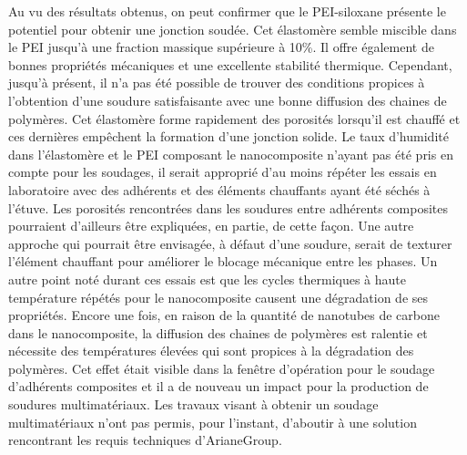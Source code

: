 Au vu des résultats obtenus, on peut confirmer que le PEI-siloxane présente le potentiel pour obtenir une jonction soudée. 
Cet élastomère semble miscible dans le PEI jusqu'à une fraction massique supérieure à 10\%. 
Il offre également de bonnes propriétés mécaniques et une excellente stabilité thermique. 
Cependant, jusqu'à présent, il n'a pas été possible de trouver des conditions propices à l'obtention d'une soudure satisfaisante avec une bonne diffusion des chaines de polymères. 
Cet élastomère forme rapidement des porosités lorsqu'il est chauffé et ces dernières empêchent la formation d'une jonction solide. 
Le taux d'humidité dans l'élastomère et le PEI composant le nanocomposite n'ayant pas été pris en compte pour les soudages, il serait approprié d'au moins répéter les essais en laboratoire avec des adhérents et des éléments chauffants ayant été séchés à l'étuve. 
Les porosités rencontrées dans les soudures entre adhérents composites pourraient d'ailleurs être expliquées, en partie, de cette façon. 
Une autre approche qui pourrait être envisagée, à défaut d'une soudure, serait de texturer l'élément chauffant pour améliorer le blocage mécanique entre les phases. 
Un autre point noté durant ces essais est que les cycles thermiques à haute température répétés pour le nanocomposite causent une dégradation de ses propriétés. 
Encore une fois, en raison de la quantité de nanotubes de carbone dans le nanocomposite, la diffusion des chaines de polymères est ralentie et nécessite des températures élevées qui sont propices à la dégradation des polymères. 
Cet effet était visible dans la fenêtre d'opération pour le soudage d'adhérents composites et il a de nouveau un impact pour la production de soudures multimatériaux. 
Les travaux visant à obtenir un soudage multimatériaux n'ont pas permis, pour l'instant, d'aboutir à une solution rencontrant les requis techniques d'ArianeGroup. 